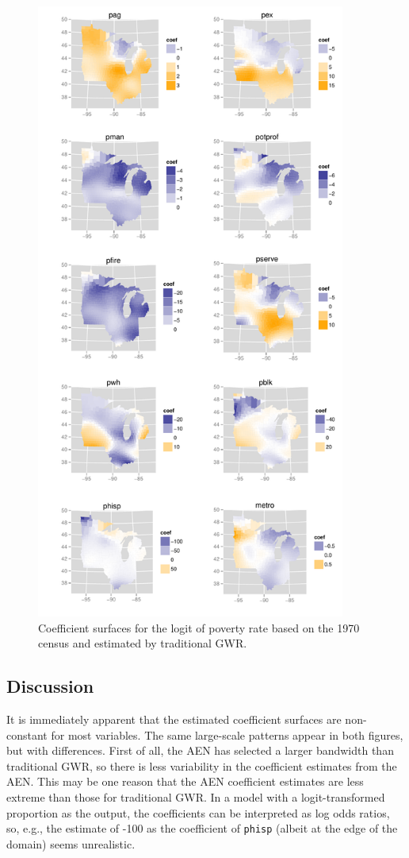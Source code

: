 \documentclass[authoryear, review, 11pt]{elsarticle}
\begin{document}
	\begin{figure}
		\begin{center}
			\includegraphics[height=8in]{../../figures/poverty/1970-gwr.pdf}
			\caption{Coefficient surfaces for the logit of poverty rate based on the 1970 census and estimated by traditional GWR. \label{fig:gwr-coefs-1970}}
		\end{center}
	\end{figure}
			
	\subsection{Discussion}
	It is immediately apparent that the estimated coefficient surfaces are non-constant for most variables. The same large-scale patterns appear in both figures, but with differences. First of all, the AEN has selected a larger bandwidth than traditional GWR, so there is less variability in the coefficient estimates from the AEN. This may be one reason that the AEN coefficient estimates are less extreme than those for traditional GWR. In a model with a logit-transformed proportion as the output, the coefficients can be interpreted as log odds ratios, so, e.g., the estimate of -100 as the coefficient of \verb!phisp! (albeit at the edge of the domain) seems unrealistic.
	
\end{document}
